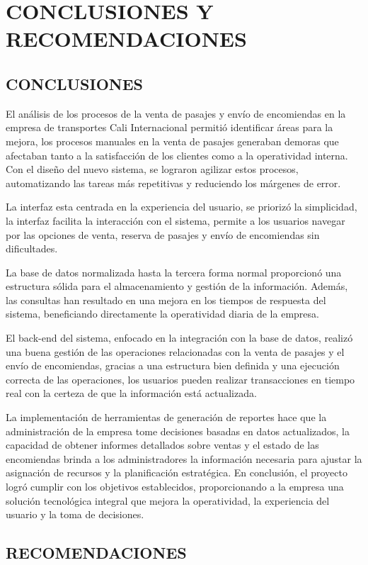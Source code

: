 \chapter{CONCLUSIONES Y RECOMENDACIONES} 
\section{CONCLUSIONES}
	El análisis de los procesos de la venta de pasajes y envío de encomiendas en la empresa de transportes Cali Internacional permitió identificar áreas para la mejora, los procesos manuales en la venta de pasajes generaban demoras que afectaban tanto a la satisfacción de los clientes como a la operatividad interna. Con el diseño del nuevo sistema, se lograron agilizar estos procesos, automatizando las tareas más repetitivas y reduciendo los márgenes de error. 
	
	La interfaz esta centrada en la experiencia del usuario, se priorizó la simplicidad, la interfaz facilita la interacción con el sistema, permite a los usuarios navegar por las opciones de venta, reserva de pasajes y envío de encomiendas sin dificultades.
	
	La base de datos normalizada hasta la tercera forma normal proporcionó una estructura sólida para el almacenamiento y gestión de la información. Además, las consultas han resultado en una mejora en los tiempos de respuesta del sistema, beneficiando directamente la operatividad diaria de la empresa.
	
	El back-end del sistema, enfocado en la integración con la base de datos, realizó una buena gestión de las operaciones relacionadas con la venta de pasajes y el envío de encomiendas, gracias a una estructura bien definida y una ejecución correcta de las operaciones, los usuarios pueden realizar transacciones en tiempo real con la certeza de que la información está actualizada.
	
	La implementación de herramientas de generación de reportes hace que la administración de la empresa tome decisiones basadas en datos actualizados, la capacidad de obtener informes detallados sobre ventas y el estado de las encomiendas brinda a los administradores la información necesaria para ajustar la asignación de recursos y la planificación estratégica. En conclusión, el proyecto logró cumplir con los objetivos establecidos, proporcionando a la empresa una solución tecnológica integral que mejora la operatividad, la experiencia del usuario y la toma de decisiones.

\section{RECOMENDACIONES}

